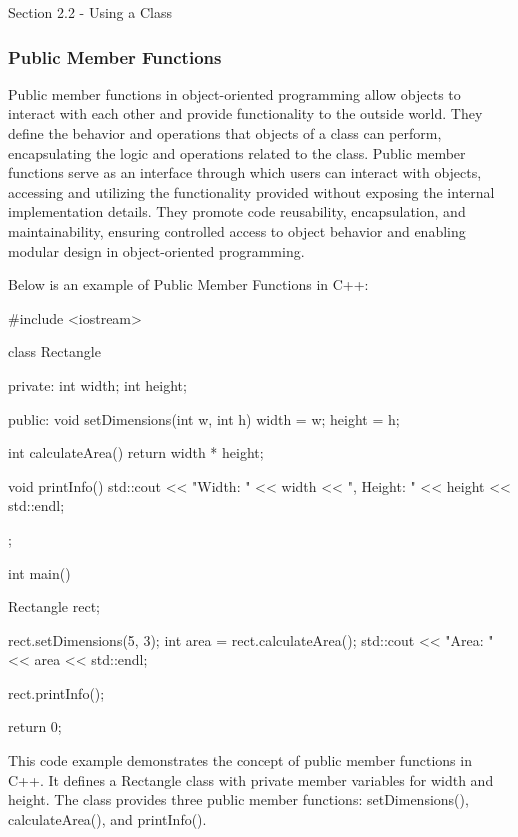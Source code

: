 \begin{notes}{Section 2.2 - Using a Class}
    \subsubsection*{Public Member Functions}

    Public member functions in object-oriented programming allow objects to interact with each other and provide functionality to the outside world. They define the behavior and operations that objects of a class can perform, encapsulating the logic and operations
    related to the class. Public member functions serve as an interface through which users can interact with objects, accessing and utilizing the functionality provided without exposing the internal implementation details. They promote code reusability, encapsulation, 
    and maintainability, ensuring controlled access to object behavior and enabling modular design in object-oriented programming.
    
    \begin{highlight}
        Below is an example of Public Member Functions in C++:
    \begin{code}[C++]
    #include <iostream>

    class Rectangle {
    private:
        int width;
        int height;
        
    public:
        void setDimensions(int w, int h) {
            width = w;
            height = h;
        }
        
        int calculateArea() {
            return width * height;
        }
        
        void printInfo() {
            std::cout << "Width: " << width << ", Height: " << height << std::endl;
        }
    };
    
    int main() {
        Rectangle rect;
        
        rect.setDimensions(5, 3);
        int area = rect.calculateArea();
        std::cout << "Area: " << area << std::endl;
        
        rect.printInfo();
        
        return 0;
    }
    \end{code}
        This code example demonstrates the concept of public member functions in C++. It defines a Rectangle class with private member variables for width and height. The class provides three public member functions: setDimensions(), calculateArea(), and printInfo().
    

\end{highlight}
\end{notes}
